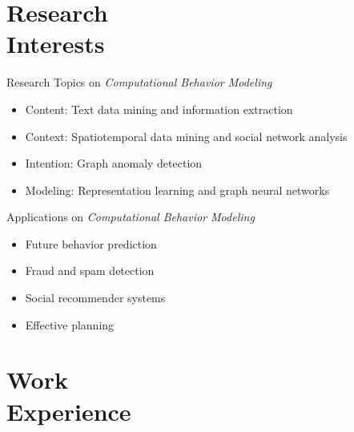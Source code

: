 \documentclass[margin, 9pt]{res}
\begin{document}
\begin{resume}

\section{Research \\ Interests}

Research Topics on \textit{Computational Behavior Modeling}
\vspace{0.03in}
\begin{itemize}
\item Content: Text data mining and information extraction		
\item Context: Spatiotemporal data mining and social network analysis
\item Intention: Graph anomaly detection 
\item Modeling: Representation learning and graph neural networks
\end{itemize}
\vspace{-0.1in}
Applications on \textit{Computational Behavior Modeling}
\vspace{-0.12in}
\begin{multicols}{2}
\begin{itemize}
\item Future behavior prediction
\item Fraud and spam detection
\item Social recommender systems
\item Effective planning
\end{itemize}
\end{multicols}


\section{Work \\ Experience}


\end{resume}
\end{document}

